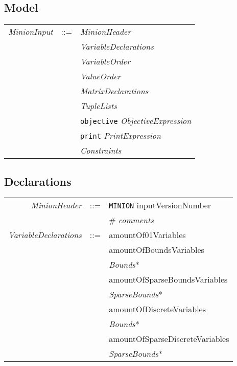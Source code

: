 \documentclass{article}
\begin{document}
\begin{small}
\noindent

\subsection{Model}
\begin{tabular}{rcl}
\textit{MinionInput}& ::= & \textit{MinionHeader} \\
                    &     & \textit{VariableDeclarations} \\
                    &     & \textit{VariableOrder} \\
                    &     & \textit{ValueOrder} \\
                    &     & \textit{MatrixDeclarations} \\
                    &     & \textit{TupleLists} \\
                    &     & \texttt{objective} \textit{ObjectiveExpression} \\ 
		    &     & \texttt{print} \textit{PrintExpression} \\
                    &     & \textit{Constraints} \\


\end{tabular}


\subsection{Declarations}
\begin{tabular}{rcl}
\textit{MinionHeader} & ::= & \texttt{MINION} inputVersionNumber\\
                     &     &  \# \textit{comments}  \\

\textit{VariableDeclarations}& ::=  
                    &  amountOf01Variables  \\
               &     &  amountOfBoundsVariables \\
               &     &  \textit{Bounds}*  \\
               &     &  amountOfSparseBoundsVariables \\
               &     &  \textit{SparseBounds}* \\
               &     &  amountOfDiscreteVariables \\
               &     & \textit{Bounds}* \\
               &     & amountOfSparseDiscreteVariables \\
               &     & \textit{SparseBounds}* \\


\end{tabular}
\end{small}
\end{document}
